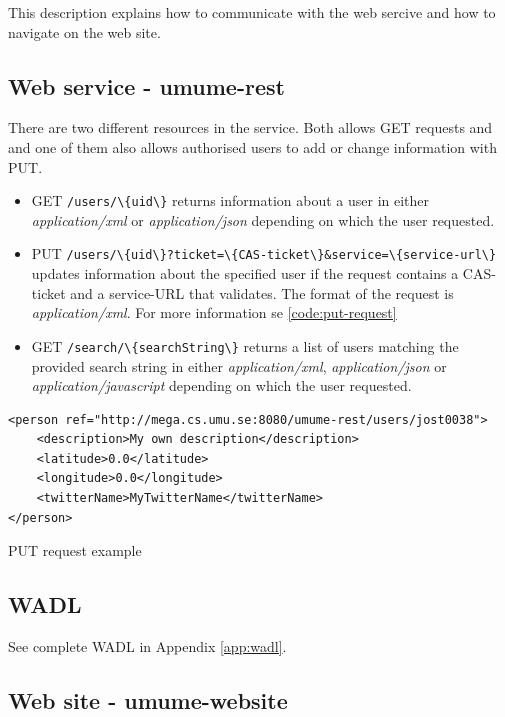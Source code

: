 \documentclass[titlepage, twocolumn, a4paper, 10pt]{article}
\begin{document}
This description explains how to communicate with the web sercive and
how to navigate on the web site.

\subsection{Web service - umume-rest}
There are two different resources in the service. Both allows GET requests and
and one of them also allows
authorised users to add or change information with PUT.
\begin{itemize}
    \item GET \verb!/users/\{uid\}! returns information about a user in either
    \textit{application/xml} or \textit{application/json} depending on which the user 
    requested. 
    \item PUT \verb!/users/\{uid\}?ticket=\{CAS-ticket\}&service=\{service-url\}! updates information about the specified user if the request contains a CAS-ticket and a service-URL that validates. The
    format of the request is \textit{application/xml}. For more information se \ref{code:put-request}
    \item GET \verb!/search/\{searchString\}! returns a list of users matching the provided 
    search string in either
    \textit{application/xml}, \textit{application/json} or \textit{application/javascript}
     depending on which the user requested.
\end{itemize}

\begin{code}
  \begin{footnotesize}
\begin{verbatim}
<person ref="http://mega.cs.umu.se:8080/umume-rest/users/jost0038">
    <description>My own description</description>
    <latitude>0.0</latitude>
    <longitude>0.0</longitude>
    <twitterName>MyTwitterName</twitterName>
</person>
\end{verbatim}
  \end{footnotesize}
  \caption{PUT request example}\label{code:put-request}
\end{code}

\subsection{WADL}

See complete WADL in Appendix \ref{app:wadl}.


\subsection{Web site - umume-website}
\end{document}
